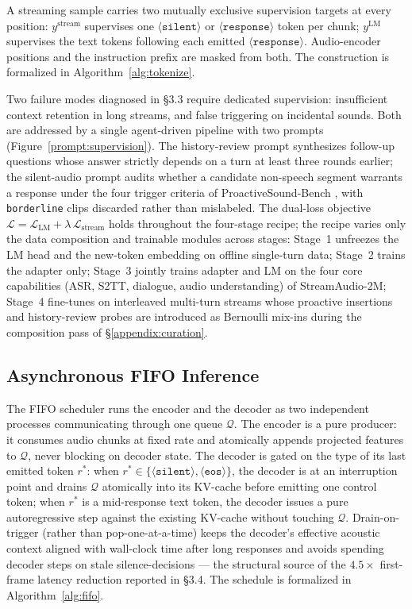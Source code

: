 \documentclass{article}
\begin{document}
A streaming sample carries two mutually exclusive supervision targets at
every position: $y^{\text{stream}}$ supervises one
$\langle\texttt{silent}\rangle$ or $\langle\texttt{response}\rangle$ token
per chunk; $y^{\text{LM}}$ supervises the text tokens following each
emitted $\langle\texttt{response}\rangle$. Audio-encoder positions and
the instruction prefix are masked from both. The construction is
formalized in Algorithm~\ref{alg:tokenize}.

Two failure modes diagnosed in \S3.3 require dedicated supervision:
insufficient context retention in long streams, and false triggering on
incidental sounds. Both are addressed by a single agent-driven pipeline
with two prompts (Figure~\ref{prompt:supervision}). The history-review
prompt synthesizes follow-up questions whose answer strictly depends on
a turn at least three rounds earlier; the silent-audio prompt audits
whether a candidate non-speech segment warrants a response under the
four trigger criteria of ProactiveSound-Bench
, with \texttt{borderline}
clips discarded rather than mislabeled. The dual-loss objective
$\mathcal{L}=\mathcal{L}_{\text{LM}}+\lambda\,\mathcal{L}_{\text{stream}}$
holds throughout the four-stage recipe; the recipe varies only the data
composition and trainable modules across stages: Stage~1 unfreezes the
LM head and the new-token embedding on offline single-turn data;
Stage~2 trains the adapter only; Stage~3 jointly trains adapter and LM
on the four core capabilities (ASR, S2TT, dialogue, audio understanding)
of StreamAudio-2M; Stage~4 fine-tunes on interleaved multi-turn
streams whose proactive insertions and history-review probes are
introduced as Bernoulli mix-ins during the composition pass of
\S\ref{appendix:curation}.

\subsection{Asynchronous FIFO Inference}
\label{appendix:fifo-inference}

The FIFO scheduler runs the encoder and the decoder as two independent
processes communicating through one queue $\mathcal{Q}$. The encoder is
a pure producer: it consumes audio chunks at fixed rate and atomically
appends projected features to $\mathcal{Q}$, never blocking on decoder
state. The decoder is gated on the type of its last emitted token $r^*$:
when $r^*\!\in\!\{\langle\texttt{silent}\rangle,
\langle\texttt{eos}\rangle\}$, the decoder is at an interruption point
and drains $\mathcal{Q}$ atomically into its KV-cache before emitting
one control token; when $r^*$ is a mid-response text token, the decoder
issues a pure autoregressive step against the existing KV-cache without
touching $\mathcal{Q}$. Drain-on-trigger (rather than pop-one-at-a-time)
keeps the decoder's effective acoustic context aligned with wall-clock
time after long responses and avoids spending decoder steps on stale
silence-decisions --- the structural source of the $4.5\times$
first-frame latency reduction reported in \S3.4. The schedule is
formalized in Algorithm~\ref{alg:fifo}.
\end{document}
